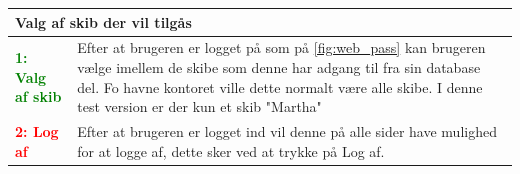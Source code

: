 \begin{table}[H]
\begin{tabular}{l p{12.5cm}}
\multicolumn{2}{l}{Valg af skib der vil tilgås } \\
\hline
\textcolor{green}{\textbf{1: Valg af skib}}
&Efter at brugeren er logget på som på \ref{fig:web_pass} kan brugeren vælge imellem de skibe som denne har adgang til fra sin database del. Fo havne kontoret ville dette normalt være alle skibe. I denne test version er der kun et skib "Martha"\\
\textcolor{red}{\textbf{2: Log af}}
&Efter at brugeren er logget ind vil denne på alle sider have mulighed for at logge af, dette sker ved at trykke på Log af.\\
\end{tabular}
\end{table}


